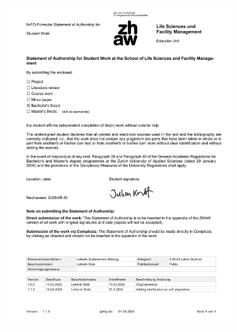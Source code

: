 \thispagestyle{empty}
\begin{figure}[h!]
    \centering
    \includegraphics[width=0.9\textwidth]{appendix/declaration_independence.pdf}
\end{figure}
\restoregeometry %
